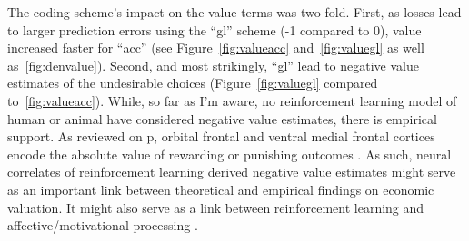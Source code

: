 The coding scheme's impact on the value terms was two fold.  First, as losses lead to larger prediction errors using the ``gl'' scheme (-1 compared to 0), value increased faster for ``acc'' (see Figure~\ref{fig:valueacc} and~\ref{fig:valuegl} as well as~\ref{fig:denvalue}).  Second, and most strikingly, ``gl'' lead to negative value estimates of the undesirable choices (Figure~\ref{fig:valuegl} compared to~\ref{fig:valueacc}).  While, so far as I'm aware, no reinforcement learning model of human or animal have considered negative value estimates, there is empirical support.  As reviewed on p\pageref{subsub:fclt}, orbital frontal and ventral medial frontal cortices encode the absolute value of rewarding or punishing outcomes \cite{ODoherty:2001p2423,Hornak:2004p6234}.  As such, neural correlates of reinforcement learning derived negative value estimates might serve as an important link between theoretical and empirical findings on economic valuation.  It might also serve as a link between reinforcement learning and affective/motivational processing \cite{Knutson:2005p1627,Delgado:2004p6665}.

